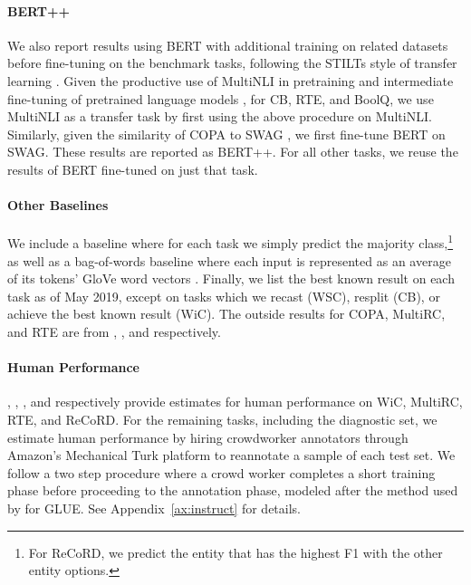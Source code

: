 \paragraph{BERT++} We also report results using BERT with additional training on related datasets before fine-tuning on the benchmark tasks, following the STILTs style of transfer learning \citep{phang2018sentence}. Given the productive use of MultiNLI in pretraining and intermediate fine-tuning of pretrained language models \citep[][i.a.]{conneau2017supervised,phang2018sentence}, for CB, RTE, and BoolQ, we use MultiNLI as a transfer task by first using the above procedure on MultiNLI. Similarly, given the similarity of COPA to SWAG \citep{zellers2018swag}, we first fine-tune BERT on SWAG. These results are reported as BERT++. For all other tasks, we reuse the results of BERT fine-tuned on just that task.

\paragraph{Other Baselines} We include a baseline where for each task we simply predict the majority class,\footnote{For ReCoRD, we predict the entity that has the highest F1 with the other entity options.} as well as a bag-of-words baseline where each input is represented as an average of its tokens' GloVe word vectors \citep[the 300D/840B release from][]{pennington2014glove}. 
Finally, we list the best known result on each task as of May 2019, except on tasks which we recast (WSC), resplit (CB), or achieve the best known result (WiC). 
The outside results for COPA, MultiRC, and RTE are from  \citet{sap2019socialiqa}, \citet{trivedi2019repurposing}, and \citet{liu2019mt} respectively.

\paragraph{Human Performance}
\citet{pilehvar2018wic}, \citet{khashabi2018looking}, \citet{nangia2019human}, and \citet{zhang2018record} respectively provide estimates for human performance on WiC, MultiRC, RTE, and ReCoRD. 
For the remaining tasks, including the diagnostic set, we estimate human performance by hiring crowdworker annotators through Amazon's Mechanical Turk platform to reannotate a sample of each test set.
We follow a two step procedure where a crowd worker completes a short training phase before proceeding to the annotation phase, modeled after the method used by \citet{nangia2019human} for GLUE. 
See Appendix~\ref{ax:instruct} for details.

